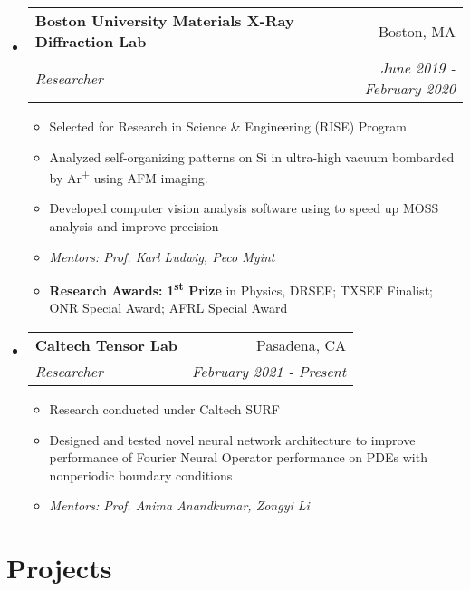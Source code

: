 \documentclass[letterpaper,11pt]{article}
\makeatletter
\newcommand{\resitem}[1]{\item #1 \vspace{-3pt}}
\newcommand{\ressubheading}[4]{
	\begin{tabular*}{7.0in}{l@{\extracolsep{\fill}}r}
			#1 & #2 \\
			\textit{#3} & \textit{#4}
	\end{tabular*}\vspace{-6pt}
}
\makeatother
\begin{document}
\begin{itemize}[leftmargin=*]
	\item 
		\ressubheading{\textbf{Boston University Materials X-Ray Diffraction Lab}}{Boston, MA}{Researcher}{June 2019 - February 2020}
			\begin{itemize}[leftmargin=*]
				\resitem{Selected for Research in Science \& Engineering (RISE) Program}
				\resitem{Analyzed self-organizing patterns on Si in ultra-high vacuum bombarded by Ar\textsuperscript{+} using AFM imaging.}
				\resitem{Developed computer vision analysis software using to speed up MOSS analysis and improve precision}
				\resitem{\textit{Mentors: Prof. Karl Ludwig, Peco Myint}}
				\resitem{\textbf{Research Awards:} \textbf{1\textsuperscript{st} Prize} in Physics, DRSEF; TXSEF Finalist; ONR Special Award; AFRL Special Award}
			\end{itemize}
		
	\item 
		\ressubheading{\textbf{Caltech Tensor Lab}}{Pasadena, CA}{Researcher}{February 2021 - Present}
			\begin{itemize}[leftmargin=*]
				\resitem{Research conducted under Caltech SURF}
				\resitem{Designed and tested novel neural network architecture to improve performance of Fourier Neural Operator performance on PDEs with nonperiodic boundary conditions}
				\resitem{\textit{Mentors: Prof. Anima Anandkumar, Zongyi Li}}
			\end{itemize}
\end{itemize}

\section{Projects}
\end{document}
